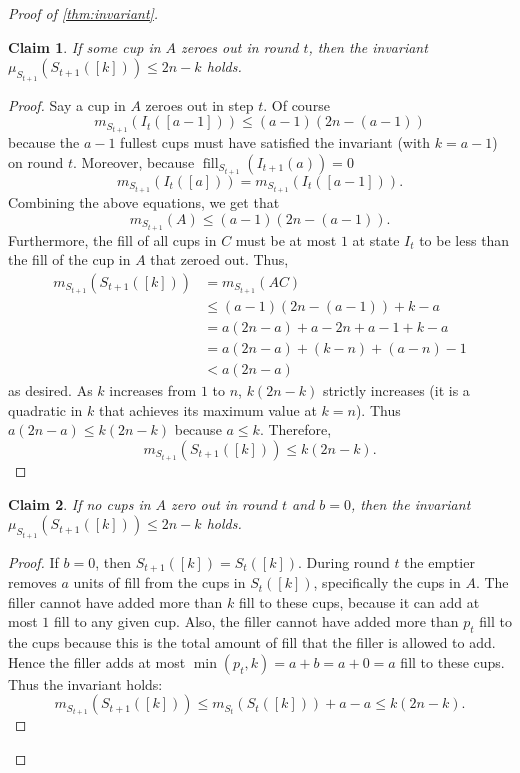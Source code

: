 \documentclass[twocolumn]{article}[10pt]
\DeclareMathOperator{\fil}{\text{fill}}
\newtheorem{clm}{Claim}
\begin{document}
\begin{proof}[Proof of \cref{thm:invariant}]
\begin{clm}
  If some cup in $A$ zeroes out in round $t$, then the invariant
  $\mu_{S_{t+1}}(S_{t+1}([k])) \le 2n-k$ holds.
\end{clm}
\begin{proof}
  Say a cup in $A$ zeroes out in step $t$. 
  Of course
  $$m_{S_{t+1}}(I_t([a-1])) \le (a-1)(2n-(a-1))$$
  because the $a-1$ fullest cups must have satisfied the invariant (with $k = a - 1$) on round
  $t$. Moreover, because $\fil_{S_{t+1}}(I_{t+1}(a)) = 0$
  $$m_{S_{t+1}}(I_t([a])) = m_{S_{t+1}}(I_t([a-1])).$$
  Combining the above equations, we get that
  $$m_{S_{t+1}}(A) \le (a-1)(2n-(a-1)).$$
  Furthermore, the fill of all cups in $C$ must be at most $1$ at state $I_t$ to be
  less than the fill of the cup in $A$ that zeroed out. Thus, 
  \begin{align*}
      m_{S_{t+1}}(S_{t+1}([k])) & = m_{S_{t + 1}}(AC)\\ 
                                & \le (a-1)(2n-(a-1))+k-a\\
                                &= a(2n-a) +a -2n+a-1 + k -a\\
                                &= a(2n-a) + (k-n) + (a-n) -1\\
                                &< a(2n-a)
  \end{align*}
  as desired. As $k$ increases from $1$ to $n$, $k(2n-k)$ strictly increases (it is a
  quadratic in $k$ that achieves its maximum value at $k=n$).
  Thus $a(2n-a) \le k(2n-k)$ because $a\le k$.
  Therefore,
  $$m_{S_{t+1}}(S_{t+1}([k])) \le k(2n-k).$$
\end{proof}

\begin{clm}
  If no cups in $A$ zero out in round $t$ and $b=0$, then the invariant
  $\mu_{S_{t+1}}(S_{t+1}([k])) \le 2n-k$ holds.
\end{clm}
\begin{proof}
If $b=0$, then $S_{t+1}([k]) = S_t([k])$. 
During round $t$ the emptier removes $a$ units of fill from the cups in $S_t([k])$,
specifically the cups in $A$. The filler cannot have added more than $k$ fill
to these cups, because it can add at most $1$ fill to any given cup. Also, the
filler cannot have added more than $p_t$ fill to the cups because this is the
total amount of fill that the filler is allowed to add. Hence the filler adds
at most $\min(p_t, k) = a+b=a+0=a$ fill to these cups.
Thus the invariant holds:
$$m_{S_{t+1}}(S_{t+1}([k])) \le m_{S_t}(S_t([k]))+a-a \le k(2n-k).$$
\end{proof}


\end{proof}
\end{document}
